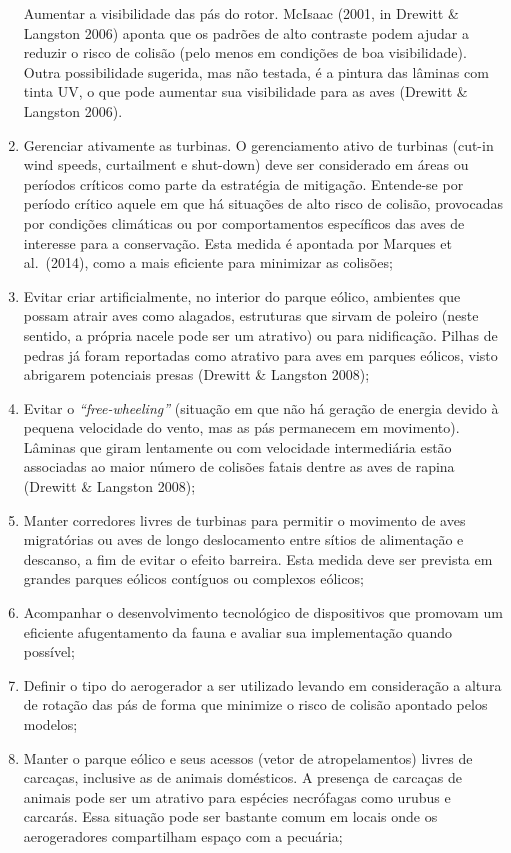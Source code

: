 \documentclass[
  oneside]{scrbook}
\begin{document}
\begin{enumerate}
  Aumentar a visibilidade das pás do rotor. McIsaac (2001, in Drewitt \& Langston 2006) aponta que os padrões de alto contraste podem ajudar a reduzir o risco de colisão (pelo menos em condições de boa visibilidade). Outra possibilidade sugerida, mas não testada, é a pintura das lâminas com tinta UV, o que pode aumentar sua visibilidade para as aves (Drewitt \& Langston 2006).
\item
  Gerenciar ativamente as turbinas. O gerenciamento ativo de turbinas (cut-in wind speeds, curtailment e shut-down) deve ser considerado em áreas ou períodos críticos como parte da estratégia de mitigação. Entende-se por período crítico aquele em que há situações de alto risco de colisão, provocadas por condições climáticas ou por comportamentos específicos das aves de interesse para a conservação. Esta medida é apontada por Marques et al.~(2014), como a mais eficiente para minimizar as colisões;
\item
  Evitar criar artificialmente, no interior do parque eólico, ambientes que possam atrair aves como alagados, estruturas que sirvam de poleiro (neste sentido, a própria nacele pode ser um atrativo) ou para nidificação. Pilhas de pedras já foram reportadas como atrativo para aves em parques eólicos, visto abrigarem potenciais presas (Drewitt \& Langston 2008);
\item
  Evitar o \emph{``free-wheeling''} (situação em que não há geração de energia devido à pequena velocidade do vento, mas as pás permanecem em movimento). Lâminas que giram lentamente ou com velocidade intermediária estão associadas ao maior número de colisões fatais dentre as aves de rapina (Drewitt \& Langston 2008);
\item
  Manter corredores livres de turbinas para permitir o movimento de aves migratórias ou aves de longo deslocamento entre sítios de alimentação e descanso, a fim de evitar o efeito barreira. Esta medida deve ser prevista em grandes parques eólicos contíguos ou complexos eólicos;
\item
  Acompanhar o desenvolvimento tecnológico de dispositivos que promovam um eficiente afugentamento da fauna e avaliar sua implementação quando possível;
\item
  Definir o tipo do aerogerador a ser utilizado levando em consideração a altura de rotação das pás de forma que minimize o risco de colisão apontado pelos modelos;
\item
  Manter o parque eólico e seus acessos (vetor de atropelamentos) livres de carcaças, inclusive as de animais domésticos. A presença de carcaças de animais pode ser um atrativo para espécies necrófagas como urubus e carcarás. Essa situação pode ser bastante comum em locais onde os aerogeradores compartilham espaço com a pecuária;

\end{enumerate}
\end{document}
